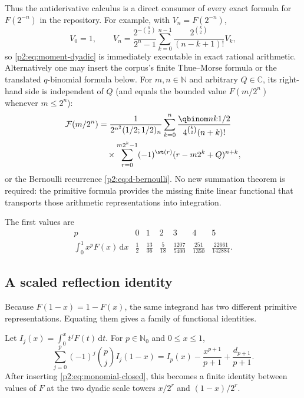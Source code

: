 \documentclass[11pt,oneside]{article}
\theoremstyle{definition}
\theoremstyle{remark}
\newcommand{\C}{\mathbb C}
\newcommand{\N}{\mathbb N}
\newcommand{\dd}{\,\mathrm d}
\newcommand{\1}{\mathbf 1}
\begin{document}
Thus the antiderivative calculus is a direct consumer of every exact formula
for $F(2^{-n})$ in the repository.  For example, with $V_n=F(2^{-n})$,
\begin{equation}
 V_0=1,\qquad
 V_n=\frac{2^{-\binom n2}}{2^n-1}
 \sum_{k=0}^{n-1}\frac{2^{\binom k2}}{(n-k+1)!}V_k,       \label{p2:eq:V-recurrence}
\end{equation}
so \eqref{p2:eq:moment-dyadic} is immediately executable in exact rational
arithmetic.  Alternatively one may insert the corpus's finite Thue--Morse
formula or the translated $q$-binomial formula below.  For
$m,n\in\N$ and arbitrary $Q\in\C$, its right-hand side is independent of
$Q$ (and equals the bounded value $F(m/2^n)$ whenever $m\le2^n$):
\begin{align}
 \mathcal F(m/2^n)
 &=\frac{1}{2^{n^2}(1/2;1/2)_n}
 \sum_{k=0}^{n}
 \frac{\qbinom nk{1/2}}{4^{\binom k2}(n+k)!}              \notag\\
 &\quad\times\sum_{r=0}^{m2^k-1}(-1)^{\wt(r)}
 (r-m2^k+Q)^{n+k},                                        \label{p2:eq:q-dyadic-import}
\end{align}
or the Bernoulli recurrence \eqref{p2:eq:d-bernoulli}.  No new summation theorem
is required: the primitive formula provides the missing finite linear
functional that transports those arithmetic representations into integration.

The first values are
\begin{equation}
\begin{array}{c|cccccc}
 p&0&1&2&3&4&5\\ \hline
 \displaystyle\int_0^1x^pF(x)\dd x
 &\frac12&\frac{13}{36}&\frac5{18}&\frac{1207}{5400}
 &\frac{251}{1350}&\frac{22661}{142884}.
\end{array}                                                \label{p2:eq:first-moments-table}
\end{equation}

\subsection{A scaled reflection identity}
Because $F(1-x)=1-F(x)$, the same integrand has two different primitive
representations.  Equating them gives a family of functional identities.

\begin{proposition}
\label{p2:prop:integrated-reflection}
Let $I_j(x)=\int_0^xt^jF(t)\dd t$.  For $p\in\N_0$ and $0\le x\le1$,
\begin{equation}
 \boxed{
 \sum_{j=0}^{p}(-1)^j\binom pj I_j(1-x)
 =I_p(x)-\frac{x^{p+1}}{p+1}+\frac{d_{p+1}}{p+1}.}         \label{p2:eq:integrated-reflection}
\end{equation}
After inserting \eqref{p2:eq:monomial-closed}, this becomes a finite identity
between values of $F$ at the two dyadic scale towers
$x/2^r$ and $(1-x)/2^r$.
\end{proposition}
\end{document}
